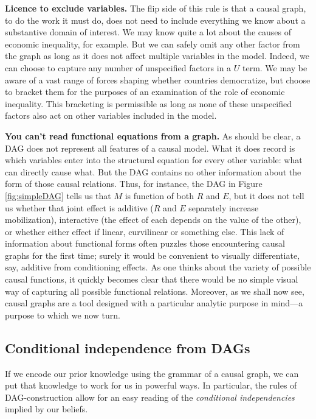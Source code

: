 \documentclass[12pt,]{book}
\begin{document}
\textbf{Licence to exclude variables.} The flip side of this rule is that a causal graph, to do the work it must do, does not need to include everything we know about a substantive domain of interest. We may know quite a lot about the causes of economic inequality, for example. But we can safely omit any other factor from the graph as long as it does not affect multiple variables in the model. Indeed, we can choose to capture any number of unspecified factors in a \(U\) term. We may be aware of a vast range of forces shaping whether countries democratize, but choose to bracket them for the purposes of an examination of the role of economic inequality. This bracketing is permissible as long as none of these unspecified factors also act on other variables included in the model.

\textbf{You can't read functional equations from a graph.} As should be clear, a DAG does not represent all features of a causal model. What it does record is which variables enter into the structural equation for every other variable: what can directly cause what. But the DAG contains no other information about the form of those causal relations. Thus, for instance, the DAG in Figure \ref{fig:simpleDAG} tells us that \(M\) is function of both \(R\) and \(E\), but it does not tell us whether that joint effect is additive (\(R\) and \(E\) separately increase mobilization), interactive (the effect of each depends on the value of the other), or whether either effect if linear, curvilinear or something else. This lack of information about functional forms often puzzles those encountering causal graphs for the first time; surely it would be convenient to visually differentiate, say, additive from conditioning effects. As one thinks about the variety of possible causal functions, it quickly becomes clear that there would be no simple visual way of capturing all possible functional relations. Moreover, as we shall now see, causal graphs are a tool designed with a particular analytic purpose in mind---a purpose to which we now turn.

\hypertarget{conditional-independence-from-dags}{%
\subsection{Conditional independence from DAGs}\label{conditional-independence-from-dags}}

If we encode our prior knowledge using the grammar of a causal graph, we can put that knowledge to work for us in powerful ways. In particular, the rules of DAG-construction allow for an easy reading of the \emph{conditional independencies} implied by our beliefs.
\end{document}

